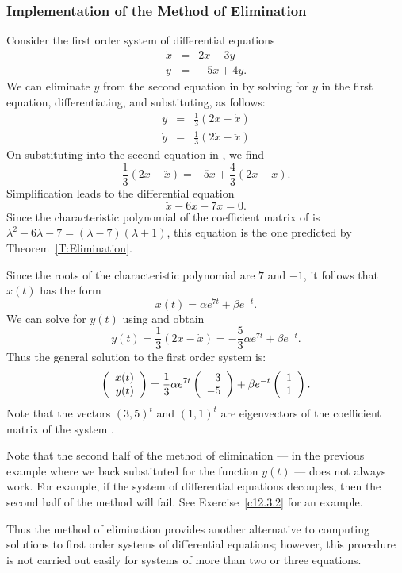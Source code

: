 \documentclass{ximera}
\begin{document}
\subsubsection*{Implementation of the Method of Elimination}

Consider the first order system of differential equations
\begin{equation}  \label{E:Elim1}
\begin{array}{rcl}
\dot{x} & = & 2x-3y\\
\dot{y} & = & -5x+4y. 
\end{array}
\end{equation}
We can eliminate $y$ from the second equation in  by solving for 
$y$ in the first equation, differentiating, and substituting, as follows:
\begin{equation} \label{E:Elim1a}
\begin{array}{rcl}
y & = & \frac{1}{3}(2x-\dot{x})\\
\dot{y} & = & \frac{1}{3}(2\dot{x}-\ddot{x})
\end{array}
\end{equation}
On substituting  into the second equation in , we
find
\[
\frac{1}{3}(2\dot{x}-\ddot{x}) = -5x + \frac{4}{3}(2x-\dot{x}).
\]
Simplification leads to the differential equation
\[
\ddot{x} - 6\dot{x} - 7x = 0.
\]
Since the characteristic polynomial of the coefficient matrix of 
is $\lambda^2-6\lambda-7=(\lambda-7)(\lambda+1)$, this equation is the one 
predicted by Theorem~\ref{T:Elimination}.

Since the roots of the characteristic polynomial are $7$ and $-1$, it follows 
that $x(t)$ has the form
\[
x(t)  =  \alpha e^{7t} + \beta e^{-t}.
\]
We can solve for $y(t)$ using  and obtain
\[
y(t) = \frac{1}{3}(2x-\dot{x}) = -\frac{5}{3} \alpha e^{7t} + \beta e^{-t}.
\]
Thus the general solution to the first order system is:
\[
\left(\begin{array}{r} x(t) \\ y(t)\end{array}\right) = \frac{1}{3}\alpha e^{7t}\left(\begin{array}{r} 3 \\ -5\end{array}\right) + 
\beta e^{-t}\left(\begin{array}{r} 1 \\ 1\end{array}\right).
\]
Note that the vectors $(3,5)^t$ and $(1,1)^t$ are eigenvectors of the coefficient matrix of the system .

Note that the second half of the method of elimination --- in the previous 
example where we back substituted for the function $y(t)$ --- does not always 
work.  For example, if the system of differential equations decouples, then 
the second half of the method will fail.   See Exercise~\ref{c12.3.2} for an 
example. 

Thus the method of elimination provides another alternative to computing 
solutions to first order systems of differential equations; however, this 
procedure is not carried out easily for systems of more than two or three 
equations.
\end{document}

